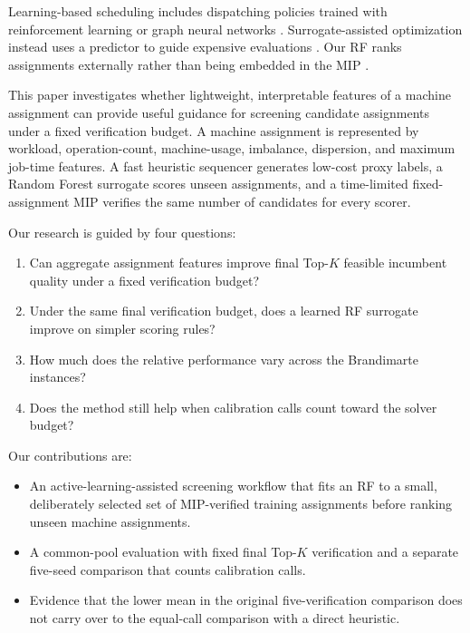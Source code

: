 \documentclass[conference]{IEEEtran}
\begin{document}
Learning-based scheduling includes dispatching policies trained with reinforcement learning or graph neural networks \cite{Zhang2020drl,Song2023,Bengio2021}. Surrogate-assisted optimization instead uses a predictor to guide expensive evaluations \cite{Jin2011}. Our RF ranks assignments externally rather than being embedded in the MIP \cite{Maragno2023}.

This paper investigates whether lightweight, interpretable features of a machine assignment can provide useful guidance for screening candidate assignments under a fixed verification budget. A machine assignment is represented by workload, operation-count, machine-usage, imbalance, dispersion, and maximum job-time features. A fast heuristic sequencer generates low-cost proxy labels, a Random Forest surrogate scores unseen assignments, and a time-limited fixed-assignment MIP verifies the same number of candidates for every scorer.

Our research is guided by four questions:
\begin{enumerate}[leftmargin=3.2em,labelsep=0.5em]
    \item[\textbf{RQ1.}] Can aggregate assignment features improve final Top-$K$ feasible incumbent quality under a fixed verification budget?
    \item[\textbf{RQ2.}] Under the same final verification budget, does a learned RF surrogate improve on simpler scoring rules?
    \item[\textbf{RQ3.}] How much does the relative performance vary across the Brandimarte instances?
    \item[\textbf{RQ4.}] Does the method still help when calibration calls count toward the solver budget?
\end{enumerate}

Our contributions are:
\begin{itemize}[leftmargin=1.2em]
\item An active-learning-assisted screening workflow that fits an RF to a small, deliberately selected set of MIP-verified training assignments before ranking unseen machine assignments.
\item A common-pool evaluation with fixed final Top-$K$ verification and a separate five-seed comparison that counts calibration calls.
\item Evidence that the lower mean in the original five-verification comparison does not carry over to the equal-call comparison with a direct heuristic.
\end{itemize}
\end{document}
